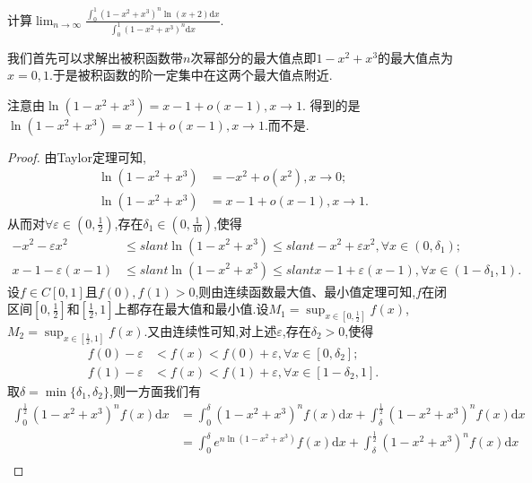\documentclass[../../main.tex]{subfiles}
\begin{document}
\begin{example}\label{Laplace方法例题4}
计算$\lim_{n\rightarrow \infty} \frac{\int_0^1{\left( 1-x^2+x^3 \right) ^n\ln \left( x+2 \right) \mathrm{d}x}}{\int_0^1{\left( 1-x^2+x^3 \right) ^n\mathrm{d}x}}.$
\end{example}
\begin{note}
我们首先可以求解出被积函数带$n$次幂部分的最大值点即$1-x^2+x^3$的最大值点为$x=0,1$.于是被积函数的阶一定集中在这两个最大值点附近.
\end{note}
\begin{remark}
注意由$\ln(1 - x^2 + x^3) = x - 1 + o(x - 1),  x\rightarrow 1$.
得到的是$\ln(1 - x^2 + x^3) = x - 1 + o(x - 1),  x\rightarrow 1$.而不是.
\end{remark}
\begin{proof}
由Taylor定理可知,
\begin{align*}
\ln(1 - x^2 + x^3) &= -x^2 + o(x^2),  x\rightarrow 0;\\
\ln(1 - x^2 + x^3) &= x - 1 + o(x - 1),  x\rightarrow 1.
\end{align*}
从而对\(\forall \varepsilon \in (0,\frac{1}{2})\),存在\(\delta_1 \in (0,\frac{1}{10})\),使得
\begin{align*}
-x^2 - \varepsilon x^2&\leqslant slant\ln(1 - x^2 + x^3)\leqslant slant -x^2 + \varepsilon x^2, \forall x\in (0,\delta_1);\\
x - 1 - \varepsilon(x - 1)&\leqslant slant\ln(1 - x^2 + x^3)\leqslant slant x - 1 + \varepsilon(x - 1), \forall x\in (1 - \delta_1,1).
\end{align*}
设\(f\in C[0,1]\)且$f(0),f(1)>0$,则由连续函数最大值、最小值定理可知,\(f\)在闭区间\([0,\frac{1}{2}]\)和$[\frac{1}{2},1]$上都存在最大值和最小值.设\(M_1 = \sup_{x\in [0,\frac{1}{2}]}f(x)\),\(M_2 = \sup_{x\in [\frac{1}{2},1]}f(x)\).又由连续性可知,对上述\(\varepsilon\),存在\(\delta_2>0\),使得
\begin{align*}
f(0) - \varepsilon&< f(x) < f(0) + \varepsilon, \forall x\in [0,\delta_2];\\
f(1) - \varepsilon&< f(x) < f(1) + \varepsilon, \forall x\in [1 - \delta_2,1].
\end{align*}
取\(\delta = \min\{\delta_1,\delta_2\}\),则一方面我们有
\begin{align*}
\int_0^{\frac{1}{2}}{(1 - x^2 + x^3)^nf(x)\mathrm{d}x}&=\int_0^{\delta}{(1 - x^2 + x^3)^nf(x)\mathrm{d}x}+\int_{\delta}^{\frac{1}{2}}{(1 - x^2 + x^3)^nf(x)\mathrm{d}x}\\
&=\int_0^{\delta}{e^{n\ln(1 - x^2 + x^3)}f(x)\mathrm{d}x}+\int_{\delta}^{\frac{1}{2}}{(1 - x^2 + x^3)^nf(x)\mathrm{d}x}\\

\end{align*}
\end{proof}
\end{document}
